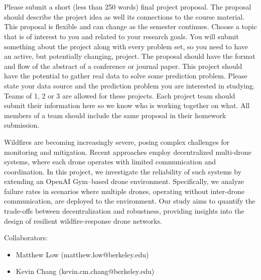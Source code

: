 \documentclass[a4paper]{article}
\begin{document}
\section{}
Please submit a short (less than 250 words) final project proposal.
The proposal should describe the project idea as well its connections to the course material.
This proposal is flexible and can change as the semester continues.
Choose a topic that is of interest to you and related to your research goals.
You will submit something about the project along with every problem set, so you need to have an active, but potentially changing, project.
The proposal should have the format and flow of the abstract of a conference or journal paper.
This project should have the potential to gather real data to solve some prediction problem.
Please state your data source and the prediction problem you are interested in studying.
Teams of 1, 2 or 3 are allowed for these projects. Each project team should submit their information here so we know who is working together on what. All members of a team should include the same proposal in their homework submission.

Wildfires are becoming increasingly severe, posing complex challenges for monitoring and mitigation. Recent approaches employ decentralized multi-drone systems, where each drone operates with limited communication and coordination. In this project, we investigate the reliability of such systems by extending an OpenAI Gym–based drone environment. Specifically, we analyze failure rates in scenarios where multiple drones, operating without inter-drone communication, are deployed to the environment. Our study aims to quantify the trade-offs between decentralization and robustness, providing insights into the design of resilient wildfire-response drone networks.

Collaborators:
\begin{itemize}
    \item Matthew Low (matthew.low@berkeley.edu)
    \item Kevin Chang (kevin.cm.chang@berkeley.edu)
\end{itemize}
\end{document}
